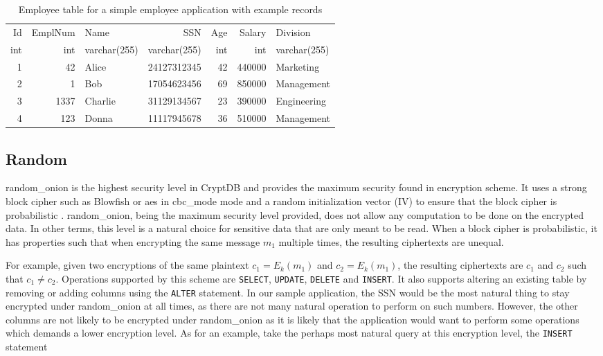 \begin{table}[H]
\centering
\begin{tabular}{| r | r | l | r | r | r | l |}
\hline
  Id & EmplNum & Name & SSN & Age & Salary & Division \\
  int & int & varchar(255) & varchar(255) & int & int & varchar(255) \\
 \hline \hline
 1 & 42 & Alice & 24127312345 & 42 & 440000 & Marketing \\
 2 & 1 & Bob & 17054623456 & 69 & 850000 & Management \\
 3 & 1337 & Charlie & 31129134567 & 23 & 390000 & Engineering \\
 4 & 123 & Donna & 11117945678 & 36 & 510000 & Management \\
 \hline

\end{tabular}
\caption{Employee table for a simple employee application with example records}
\label{demoapp_table}
\end{table}



\subsection{Random}

\Gls{random_onion} is the highest security level in CryptDB and provides the maximum security found in encryption scheme. It uses a strong block cipher such as Blowfish or \Gls{aes} in \Gls{cbc_mode} mode and a random initialization vector (IV) to ensure that the block cipher is probabilistic \citep{CryptDB_Main_Paper}. \Gls{random_onion}, being the maximum security level provided, does not allow any computation to be done on the encrypted data. In other terms, this level is a natural choice for sensitive data that are only meant to be read. When a block cipher is probabilistic, it has properties such that when encrypting the same message $m_1$ multiple times, the resulting ciphertexts are unequal. 

For example, given two encryptions of the same plaintext $c_1 = E_k(m_1)$ and $c_2 = E_k(m_1)$, the resulting ciphertexts are $c_1$ and $c_2$ such that $c_1 \neq c_2$. Operations supported by this scheme are \verb!SELECT!, \verb!UPDATE!, \verb!DELETE! and \verb!INSERT!. It also supports altering an existing table by removing or adding columns using the \verb!ALTER! statement. In our sample application, the SSN would be the most natural thing to stay encrypted under \gls{random_onion} at all times, as there are not many natural operation to perform on such numbers. However, the other columns are not likely to be encrypted under \gls{random_onion} as it is likely that the application would want to perform some operations which demands a lower encryption level. As for an example, take the perhaps most natural query at this encryption level, the \verb!INSERT! statement

